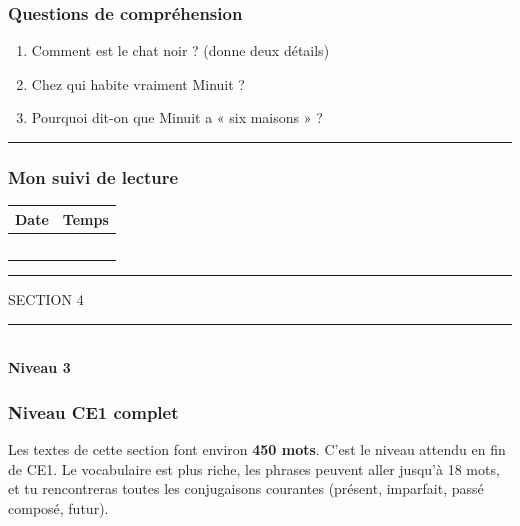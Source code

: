 \documentclass[
  french,
  14pt,
  a4paper,
]{extarticle}
\providecommand{\tightlist}{%
  \setlength{\itemsep}{0pt}\setlength{\parskip}{0pt}}
\newcommand{\sectiondivider}[2]{%
  \vspace*{2cm}%
  \begin{center}
    {\fontsize{18pt}{22pt}\selectfont\textcolor{accentcolor}{\MakeUppercase{Section #1}}}\\[0.6em]
    \textcolor{accentcolor}{\rule{0.35\textwidth}{1.5pt}}\\[1em]
    {\fontsize{38pt}{44pt}\selectfont\bfseries #2}
  \end{center}
  \vspace{1.5cm}
}
\begin{document}
\subsubsection{Questions de
compréhension}\label{questions-de-compruxe9hension-11}

\begin{enumerate}
\def\labelenumi{\arabic{enumi}.}
\tightlist
\item
  Comment est le chat noir ? (donne deux détails)
\item
  Chez qui habite vraiment Minuit ?
\item
  Pourquoi dit-on que Minuit a « six maisons » ?
\end{enumerate}

\begin{center}\rule{0.5\linewidth}{0.5pt}\end{center}

\subsubsection{Mon suivi de lecture}\label{mon-suivi-de-lecture-11}

\begin{center}
\begin{tabularx}{0.75\textwidth}{|X|X|}
\hline
\textbf{Date} & \textbf{Temps} \\
\hline
& \\
\hline
& \\
\hline
& \\
\hline
& \\
\hline
& \\
\hline
\end{tabularx}
\end{center}

\begin{center}\rule{0.5\linewidth}{0.5pt}\end{center}

\newpage

\sectiondivider{4}{Niveau 3}

\subsubsection{Niveau CE1 complet}\label{niveau-ce1-complet}

Les textes de cette section font environ \textbf{450 mots}. C'est le
niveau attendu en fin de CE1. Le vocabulaire est plus riche, les phrases
peuvent aller jusqu'à 18 mots, et tu rencontreras toutes les
conjugaisons courantes (présent, imparfait, passé composé, futur).
\end{document}

